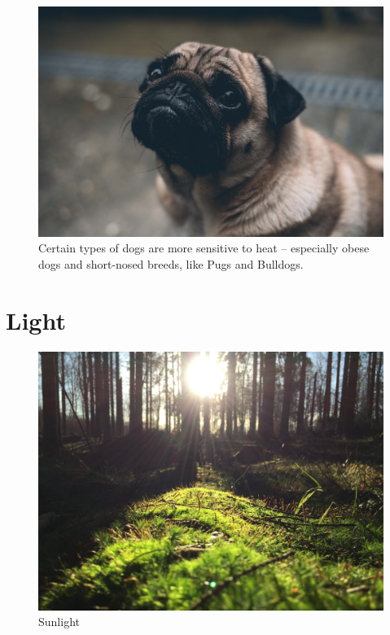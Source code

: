 \documentclass[]{book}
\begin{document}
\begin{figure}

{\centering \includegraphics[width=1\linewidth]{figures/pug} 

}

\caption{Certain types of dogs are more sensitive to heat – especially obese dogs and short-nosed breeds, like Pugs and Bulldogs.}\label{fig:heat-canine}
\end{figure}

\hypertarget{light}{%
\chapter{Light}\label{light}}

\begin{figure}

{\centering \includegraphics[width=1\linewidth]{figures/sunlight} 

}

\caption{Sunlight}\label{fig:sunlight}
\end{figure}
\end{document}
